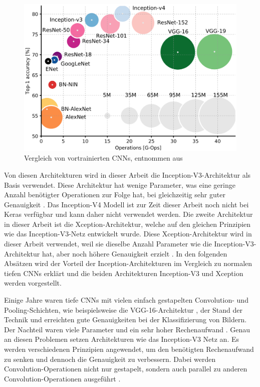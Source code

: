 \begin{figure}[h]
\centering
\includegraphics[scale=0.3]{images/comparison_cnns.png}
\caption[Vergleich von vortrainierten \aclp{CNN}]{Vergleich von vortrainierten \aclp{CNN}, entnommen aus \cite{canziani2016analysis}}
\label{fig_comparison_cnns}
\end{figure}

Von diesen Architekturen wird in dieser Arbeit die Inception-V3-Architektur \cite{szegedy2016inception} als Basis verwendet. Diese Architektur hat wenige Parameter, was eine geringe Anzahl benötigter Operationen zur Folge hat, bei gleichzeitig sehr guter Genauigkeit \cite{canziani2016analysis}. Das Inception-V4 Modell ist zur Zeit dieser Arbeit noch nicht bei Keras verfügbar und kann daher nicht verwendet werden. Die zweite Architektur in dieser Arbeit ist die Xception-Architektur, welche auf den gleichen Prinzipien wie das Inception-V3-Netz entwickelt wurde. Diese Xception-Architektur wird in dieser Arbeit verwendet, weil sie dieselbe Anzahl Parameter wie die Inception-V3-Architektur hat, aber noch höhere Genauigkeit erzielt \cite{chollet2017xception}. In den folgenden Absätzen wird der Vorteil der Inception-Architekturen im Vergleich zu normalen tiefen \acp{CNN} erklärt und die beiden Architekturen Inception-V3 und Xception werden vorgestellt.

Einige Jahre waren tiefe \acp{CNN} mit vielen einfach gestapelten Convolution- und Pooling-Schichten, wie beispielsweise die VGG-16-Architektur \cite{simonyan2014vgg}, der Stand der Technik und erreichten gute Genauigkeiten bei der Klassifizierung von Bildern. Der Nachteil waren viele Parameter und ein sehr hoher Rechenaufwand \cite{canziani2016analysis}. Genau an diesen Problemen setzen Architekturen wie das Inception-V3 Netz an. Es werden verschiedenen Prinzipien angewendet, um den benötigten Rechenaufwand zu senken und dennoch die Genauigkeit zu verbessern. Dabei werden Convolution-Operationen nicht nur gestapelt, sondern auch parallel zu anderen Convolution-Operationen ausgeführt \cite{szegedy2016inception}.

